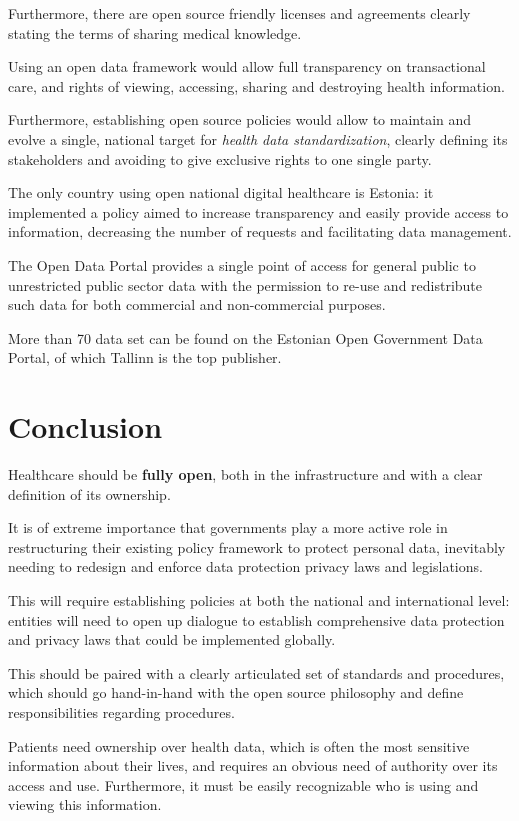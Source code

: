 \documentclass[12pt]{article}
\begin{document}
	Furthermore, there are open source friendly licenses and agreements clearly stating the terms of sharing medical knowledge. 
	
	Using an open data framework would allow full transparency on transactional care, and rights of viewing, accessing, sharing and destroying health information.
	
	Furthermore, establishing open source policies would allow to maintain and evolve a single, national target for \textit{health data standardization}, clearly defining its stakeholders and avoiding to give exclusive rights to one single party.
	
	The only country using open national digital healthcare is Estonia: it implemented a policy aimed to increase transparency and easily provide access to information, decreasing the number of requests and facilitating data management.
	
	The Open Data Portal provides a single point of access for general public to unrestricted public sector data with the permission to re-use and redistribute such data for both commercial and non-commercial purposes.
	
	More than 70 data set can be found on the Estonian Open Government Data Portal, of which Tallinn is the top publisher\cite{estonia}.
	
	\section{Conclusion}
	Healthcare should be \textbf{fully open}, both in the infrastructure and with a clear definition of its ownership. 
	
	It is of extreme importance that governments  play a more active role in restructuring their existing policy  framework to protect personal data, inevitably needing to redesign and enforce data protection privacy laws and legislations. 
	
	This will require establishing policies at both  the  national and  international level: entities will need to  open up dialogue to establish comprehensive data protection  and privacy laws that could be implemented globally. 
	
	This should be paired with a clearly articulated set of standards and procedures, which should go hand-in-hand with the open source philosophy and define responsibilities regarding procedures.
	
	Patients need ownership over health data, which is often the most sensitive information about their lives, and requires an obvious need of authority over its access and use. Furthermore, it must be easily recognizable who is using and viewing this information.
	
\end{document}
